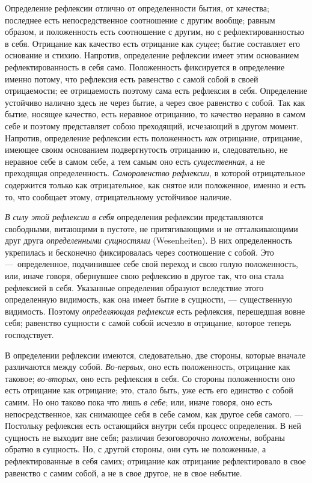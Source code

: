 Определение рефлексии отлично от определенности бытия, от качества;
последнее есть непосредственное соотношение с другим вообще; равным
образом, и положенность есть соотношение с другим, но с рефлектированностью
в себя. Отрицание как качество есть отрицание как
{\em сущее}; бытие составляет его основание и стихию.
Напротив, определение рефлексии имеет этим основанием рефлектированность в
себя само. Положенность фиксируется в определение именно потому, что
рефлексия есть равенство с самой собой в своей отрицаемости; ее
отрицаемость поэтому сама есть рефлексия в себя. Определение устойчиво
налично здесь не через бытие, а через свое равенство с собой. Так как
бытие, носящее качество, есть неравное отрицанию, то качество неравно в
самом себе и поэтому представляет собою преходящий, исчезающий в другом
момент. Напротив, определение рефлексии есть положенность
{\em как} отрицание, отрицание, имеющее своим
основанием подвергнутость отрицанию и, следовательно, не неравное себе в
самом себе, а тем самым оно есть {\em существенная}, а
не преходящая определенность. {\em Саморавенство
рефлексии}, в которой отрицательное содержится только как отрицательное,
как снятое или положенное, именно и есть то, что сообщает этому,
отрицательному устойчивое наличие.

{\em В силу этой рефлексии в себя} определения рефлексии
представляются свободными, витающими в пустоте, не притягивающими и не
отталкивающими друг друга {\em определенными
сущностями} (Wesenheiten). В них определенность укрепилась и бесконечно
фиксировалась через соотношение с собой. Это —~определенное, подчинившее
себе свой переход и свою голую положенность, или, иначе говоря, обернувшее
свою рефлексию в другое так, что она стала рефлексией в себя. Указанные
определения образуют вследствие этого определенную видимость, как она имеет
бытие в сущности, — существенную видимость. Поэтому
{\em определяющая рефлексия} есть рефлексия, перешедшая
вовне себя; равенство сущности с самой собой исчезло в отрицание, которое
теперь господствует.

В определении рефлексии имеются, следовательно, две стороны, которые вначале
различаются между собой. {\em Во-первых}, оно есть
положенность, отрицание как таковое; {\em во-вторых},
оно есть рефлексия в себя. Со стороны положенности оно есть отрицание как
отрицание; это, стало быть, уже есть его единство с собой самим. Но оно
таково пока что лишь {\em в себе}; или, иначе говоря,
оно есть непосредственное, как снимающее себя в себе самом, как другое себя
самого. — Постольку рефлексия есть остающийся внутри себя процесс
определения. В ней сущность не выходит вне себя; различия безоговорочно
{\em положены}, вобраны обратно в сущность. Но, с
другой стороны, они суть не положенные, а рефлектированные в себя самих;
отрицание {\em как} отрицание рефлектировало в свое
равенство с самим собой, а не в свое другое, не в свое небытие.

